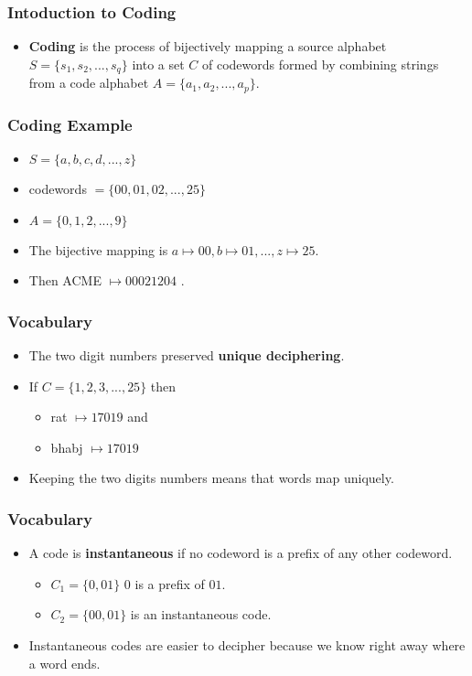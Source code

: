 \documentclass{beamer}
\begin{document}
\begin{frame}
\frametitle{Intoduction to Coding}
\begin{itemize}
\item \textbf{Coding} is the process of bijectively mapping a source alphabet  $S = \{s_1, s_2, ..., s_q\} $ into a set $C$ of codewords formed by combining strings from a code alphabet $A = \{ a_1, a_2, ..., a_p \}$.
\end{itemize}
\end{frame}
\begin{frame}
\frametitle{Coding Example}
\begin{itemize}
\item $S = \{ a, b,c, d, ..., z \}$
\item codewords $ = \{ 00, 01, 02, ..., 25\}$
\item $A = \{0,1,2,...,9\} $
\item The bijective mapping is $ a \mapsto 00, b \mapsto 01 , ..., z \mapsto 25$.
\item Then ACME $\mapsto 00021204$ .
\end{itemize}

\end{frame}
\begin{frame}
\frametitle{Vocabulary}
\begin{itemize}
\item The two digit numbers preserved \textbf{unique deciphering}.
\item If $C = \{1, 2, 3, ..., 25 \}$ then 
	\begin{itemize}
	\item rat $\mapsto 17019$ and 
	\item bhabj $\mapsto 17019$ 
	\end{itemize}
\item Keeping the two digits numbers means that words map uniquely.
\end{itemize}
\end{frame}
\begin{frame}
\frametitle{Vocabulary}
\begin{itemize}
\item A code is \textbf{instantaneous} if no codeword is a prefix of any other codeword.
	\begin{itemize}
	\item $C_1 = \{0, 01\} $ $0$ is a prefix of $01$.
	\item $C_2 = \{00, 01\} $ is an instantaneous code.
	\end{itemize}
\item Instantaneous codes are easier to decipher because we know right away where a word ends.
\end{itemize}
\end{frame}
\end{document}
